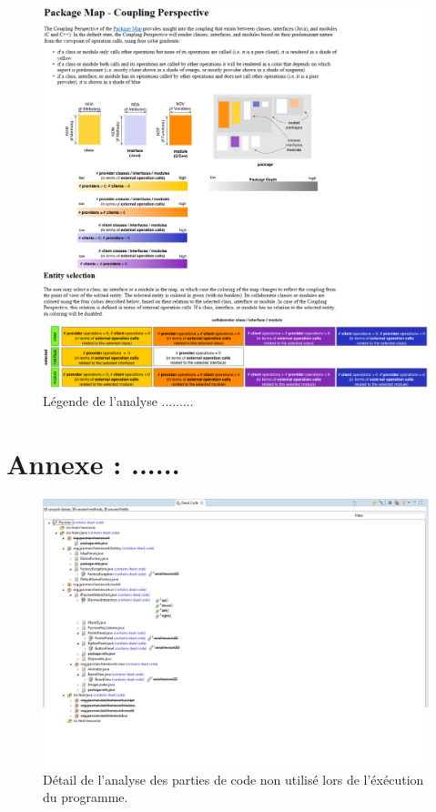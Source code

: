 \documentclass[12pt,a4paper,final]{article}
\begin{document}
\begin{figure}
	\centering
	\includegraphics[width=\textwidth]{images/InCodeCouplingLegende.png}
	\caption{\label{incodeCouplLeg}Légende de l'analyse .........}
\end{figure}








\newpage
\section{Annexe : ......}\label{DeadCode}

\begin{figure}
	\centering
	\includegraphics[width=\textwidth]{images/DeadCode.png}
	\caption{\label{deadcode}Détail de l'analyse des parties de code non utilisé lors de l'éxécution du programme.}
\end{figure}
\end{document}
